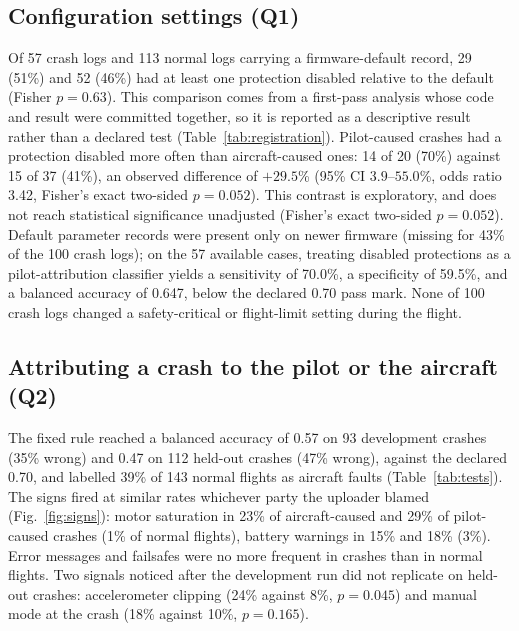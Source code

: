 \documentclass[preprint,12pt]{elsarticle}
\begin{document}
\subsection{Configuration settings (Q1)}
\label{sec:settings}
Of 57 crash logs and 113 normal logs carrying a firmware-default record, 29 (51\%) and 52 (46\%) had at least one
protection disabled relative to the default (Fisher $p=0.63$). This comparison comes from a first-pass analysis whose code and result were committed together, so it is reported as a descriptive result rather than a declared test (Table~\ref{tab:registration}). Pilot-caused crashes had a protection disabled more
often than aircraft-caused ones: 14 of 20 (70\%) against 15 of 37 (41\%), an observed difference of $+29.5$\% (95\% CI
$3.9$--$55.0$\%, odds ratio 3.42, Fisher's exact two-sided $p=0.052$). This contrast is exploratory, and does not
reach statistical significance unadjusted (Fisher's exact two-sided $p=0.052$). Default parameter records were present only on newer firmware (missing for 43\% of the 100 crash logs); on the 57
available cases, treating disabled protections as a pilot-attribution classifier yields a sensitivity of 70.0\%, a
specificity of 59.5\%, and a balanced accuracy of 0.647, below the declared 0.70 pass mark. None of 100 crash logs
changed a safety-critical or flight-limit setting during the flight.

\FloatBarrier
\subsection{Attributing a crash to the pilot or the aircraft (Q2)}
\label{sec:attribution}
The fixed rule reached a balanced accuracy of 0.57 on 93 development crashes (35\% wrong) and 0.47 on 112 held-out
crashes (47\% wrong), against the declared 0.70, and labelled 39\% of 143 normal flights as aircraft faults
(Table~\ref{tab:tests}). The signs fired at similar rates whichever party the uploader blamed
(Fig.~\ref{fig:signs}): motor saturation in 23\% of aircraft-caused and 29\% of pilot-caused crashes (1\% of normal
flights), battery warnings in 15\% and 18\% (3\%). Error messages and failsafes were no more frequent in crashes than
in normal flights. Two signals noticed after the development run did not replicate on held-out crashes: accelerometer
clipping (24\% against 8\%, $p=0.045$) and manual mode at the crash (18\% against 10\%, $p=0.165$).
\end{document}

